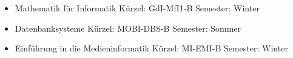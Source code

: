 \begin{itemize}
	\item Mathematik für Informatik
	\subitem Kürzel: GdI-MfI1-B
	\subitem Semester: Winter
	\item Datenbanksysteme
	\subitem Kürzel: MOBI-DBS-B
	\subitem Semester: Sommer 
	\item Einführung in die Medieninformatik
	\subitem Kürzel: MI-EMI-B
	\subitem Semester: Winter 
\end{itemize}
